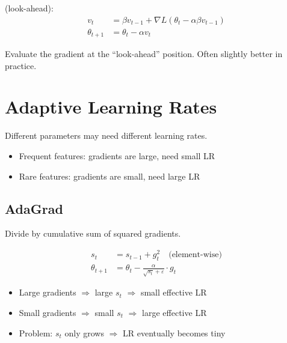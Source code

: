  (look-ahead):
\begin{align}
    v_t &= \beta v_{t-1} + \nabla L(\theta_t - \alpha \beta v_{t-1}) \\
    \theta_{t+1} &= \theta_t - \alpha v_t
\end{align}

Evaluate the gradient at the ``look-ahead'' position. Often slightly better in practice.




\newpage
\section{Adaptive Learning Rates}

 Different parameters may need different learning rates.
\begin{itemize}
    \item Frequent features: gradients are large, need small LR
    \item Rare features: gradients are small, need large LR
\end{itemize}

\subsection{AdaGrad}

 Divide by cumulative sum of squared gradients.

\begin{align}
    s_t &= s_{t-1} + g_t^2 \quad \text{(element-wise)} \\
    \theta_{t+1} &= \theta_t - \frac{\alpha}{\sqrt{s_t} + \varepsilon} \cdot g_t
\end{align}


\begin{itemize}
    \item Large gradients $\Rightarrow$ large $s_t$ $\Rightarrow$ small effective LR
    \item Small gradients $\Rightarrow$ small $s_t$ $\Rightarrow$ large effective LR
    \item Problem: $s_t$ only grows $\Rightarrow$ LR eventually becomes tiny
\end{itemize}


